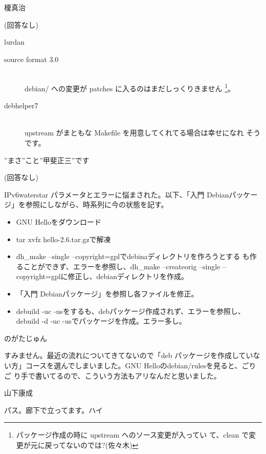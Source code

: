 \documentclass[mingoth,a4paper]{jsarticle}
\begin{document}
\begin{prework}{ 榎真治 }

(回答なし)

\end{prework}

\begin{prework}{ lurdan }

    \begin{description}
          \item[source format 3.0]　\\
        debian/ への変更が patches に入るのはまだしっくりきません%
        \footnote{%
          パッケージ作成の時に upstream へのソース変更が入ってい
          て、clean で変更が元に戻ってないのでは?(佐々木) }。
          \item[debhelper7]　\\
        upstream がまともな Makefile を用意してくれてる場合は幸せになれ
        そうです。
    \end{description}
\end{prework}
\begin{prework}{ ”まさ”こと”甲斐正三”です }

(回答なし)

\end{prework}

\begin{prework}{ IPv6waterstar }
パラメータとエラーに悩まされた。以下、「入門 Debianパッケージ」を参照にしながら、時系列に今の状態を記す。
\begin{itemize}
      \item GNU Helloをダウンロード
      \item tar xvfz hello-2.6.tar.gzで解凍
      \item dh\_make --single --copyright=gplでdebinaディレクトリを作ろうとする
    も作ることができず、エラーを参照し、dh\_make --createorig --single
    --copyright=gplに修正し、debianディレクトリを作成。
      \item 「入門 Debianパッケージ」を参照し各ファイルを修正。
      \item debuild -uc -usをするも、debパッケージ作成されず、エラーを参照し、
    debuild -d -uc -usでパッケージを作成。エラー多し。
\end{itemize}
\end{prework}

\begin{prework}{ のがたじゅん }

すみません。最近の流れについてきてないので「deb パッケージを作成していな
い方」コースを選んでしまいました。GNU Helloのdebian/rulesを見ると、ごりご
り手で書いてるので、こういう方法もアリなんだと思いました。

\end{prework}
\begin{prework}{ 山下康成 }

パス。廊下で立ってます。ハイ

\end{prework}
\end{document}
